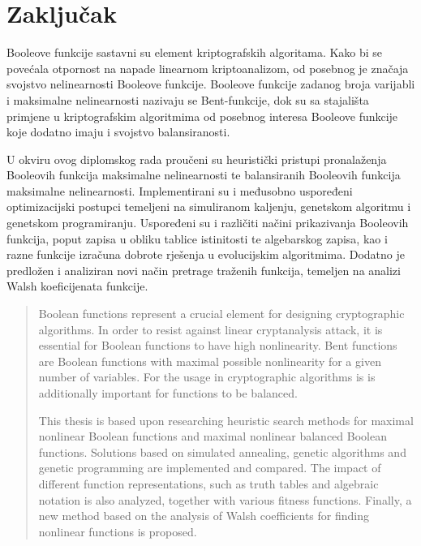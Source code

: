 \documentclass[times, utf8, diplomski, numeric]{fer}
\begin{document}
\chapter{Zaključak}




\begin{sazetak}
Booleove funkcije sastavni su element kriptografskih algoritama.
Kako bi se povećala otpornost na napade linearnom kriptoanalizom, od posebnog je značaja svojstvo nelinearnosti Booleove funkcije.
Booleove funkcije zadanog broja varijabli i maksimalne nelinearnosti nazivaju se Bent-funkcije, dok su sa stajališta primjene u kriptografskim algoritmima od posebnog interesa Booleove funkcije koje dodatno imaju i svojstvo balansiranosti.

U okviru ovog diplomskog rada proučeni su heuristički pristupi pronalaženja Booleovih funkcija maksimalne nelinearnosti te balansiranih Booleovih funkcija maksimalne nelinearnosti.
Implementirani su i međusobno uspoređeni optimizacijski postupci temeljeni na simuliranom kaljenju, genetskom algoritmu i genetskom programiranju.
Uspoređeni su i različiti načini prikazivanja Booleovih funkcija, poput zapisa u obliku tablice istinitosti te algebarskog zapisa, kao i razne funkcije izračuna dobrote rješenja u evolucijskim algoritmima.
Dodatno je predložen i analiziran novi način pretrage traženih funkcija, temeljen na analizi Walsh koeficijenata funkcije.

\end{sazetak}

\begin{abstract}
Boolean functions represent a crucial element for designing cryptographic algorithms.
In order to resist against linear cryptanalysis attack, it is essential for Boolean functions to have high nonlinearity.
Bent functions are Boolean functions with maximal possible nonlinearity for a given number of variables.
For the usage in cryptographic algorithms is is additionally important for functions to be balanced. 

This thesis is based upon researching heuristic search methods for maximal nonlinear Boolean functions and maximal nonlinear balanced Boolean functions.
Solutions based on simulated annealing, genetic algorithms and genetic programming are implemented and compared.
The impact of different function representations, such as truth tables and algebraic notation is also analyzed, together with various fitness functions.
Finally, a new method based on the analysis of Walsh coefficients for finding nonlinear functions is proposed.


\end{abstract}
\end{document}
